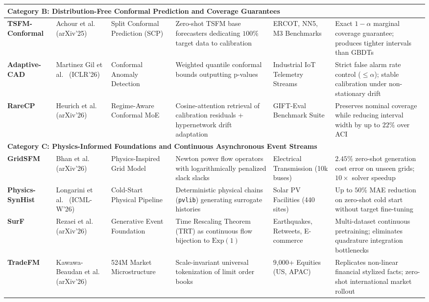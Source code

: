 \begin{table}[t]
{\begin{tabular}{lp{2.2cm}p{3.0cm}p{3.2cm}p{2.6cm}p{4.4cm}}
\multicolumn{6}{l}{\textbf{Category B: Distribution-Free Conformal Prediction and Coverage Guarantees}} \\
\midrule
\textbf{TSFM-Conformal} & Achour et al.~\cite{achour2025conformal} (arXiv'25) & Split Conformal Prediction (SCP) & Zero-shot TSFM base forecasters dedicating $100\%$ target data to calibration & ERCOT, NN5, M3 Benchmarks & Exact $1-\alpha$ marginal coverage guarantee; produces tighter intervals than GBDTs \\
\midrule
\textbf{Adaptive-CAD} & Martinez Gil et al.~\cite{martinezgil2026adaptive} (ICLR'26) & Conformal Anomaly Detection & Weighted quantile conformal bounds outputting p-values & Industrial IoT Telemetry Streams & Strict false alarm rate control ($\le \alpha$); stable calibration under non-stationary drift \\
\midrule
\textbf{RareCP} & Heurich et al.~\cite{heurich2026rarecp} (arXiv'26) & Regime-Aware Conformal MoE & Cosine-attention retrieval of calibration residuals + hypernetwork drift adaptation & GIFT-Eval Benchmark Suite & Preserves nominal coverage while reducing interval width by up to $22\%$ over ACI \\
\midrule
\multicolumn{6}{l}{\textbf{Category C: Physics-Informed Foundations and Continuous Asynchronous Event Streams}} \\
\midrule
\textbf{GridSFM} & Bhan et al.~\cite{bhan2026gridsfm} (arXiv'26) & Physics-Inspired Grid Model & Newton power flow operators with logarithmically penalized slack slacks & Electrical Transmission (10k buses) & $2.45\%$ zero-shot generation cost error on unseen grids; $10\times$ solver speedup \\
\midrule
\textbf{Physics-SynHist} & Longarini et al.~\cite{longarini2026physics} (ICML-W'26) & Cold-Start Physical Pipeline & Deterministic physical chains (\texttt{pvlib}) generating surrogate histories & Solar PV Facilities (440 sites) & Up to $50\%$ MAE reduction on zero-shot cold start without target fine-tuning \\
\midrule
\textbf{SurF} & Rezaei et al.~\cite{rezaei2026surf} (arXiv'26) & Generative Event Foundation & Time Rescaling Theorem (TRT) as continuous flow bijection to $\text{Exp}(1)$ & Earthquakes, Retweets, E-commerce & Multi-dataset continuous pretraining; eliminates quadrature integration bottlenecks \\
\midrule
\textbf{TradeFM} & Kawawa-Beaudan et al.~\cite{kawawabeaudan2026tradefm} (arXiv'26) & 524M Market Microstructure & Scale-invariant universal tokenization of limit order books & 9,000+ Equities (US, APAC) & Replicates non-linear financial stylized facts; zero-shot international market rollout \\
\bottomrule
\end{tabular}
}
\end{table}

